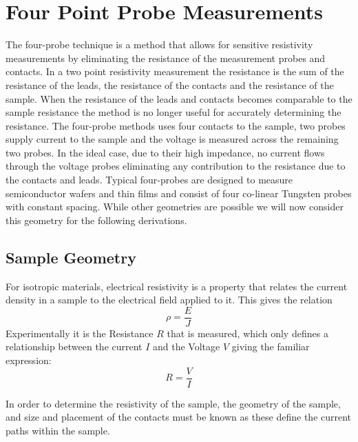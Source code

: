 
\chapter{Four Point Probe Measurements}

    
    The four-probe technique is a method that allows for sensitive resistivity measurements by eliminating the resistance of the measurement probes and contacts. In a two point resistivity measurement the resistance is the sum of the resistance of the leads, the resistance of the contacts and the resistance of the sample. %
    When the resistance of the leads and contacts becomes comparable to the sample resistance the method is no longer useful for accurately determining the resistance. The four-probe methods uses four contacts to the sample, two probes supply current to the sample and the voltage is measured across the remaining two probes. In the ideal case, due to their high impedance, no current flows through the voltage probes eliminating any contribution to the resistance due to the contacts and leads. Typical four-probes are designed to measure semiconductor wafers and thin films and consist of four co-linear Tungsten probes with constant spacing. While other geometries are possible %
    we will now consider this geometry for the following derivations. 
    
 \section{Sample Geometry}
 
    For isotropic materials, electrical resistivity is a property that relates the current density in a sample to the electrical field applied to it. This gives the relation \begin{equation}
        \rho = \frac{E}{J}
    \end{equation}
    Experimentally it is the Resistance $R$ that is measured, which only defines a relationship between the current $I$ and the Voltage $V$ giving the familiar expression: \begin{equation}
        R = \frac{V}{I}
    \end{equation}
    
    In order to determine the resistivity of the sample, the geometry of the sample, and size and placement of the contacts must be known as these define the current paths within the sample. 
    
